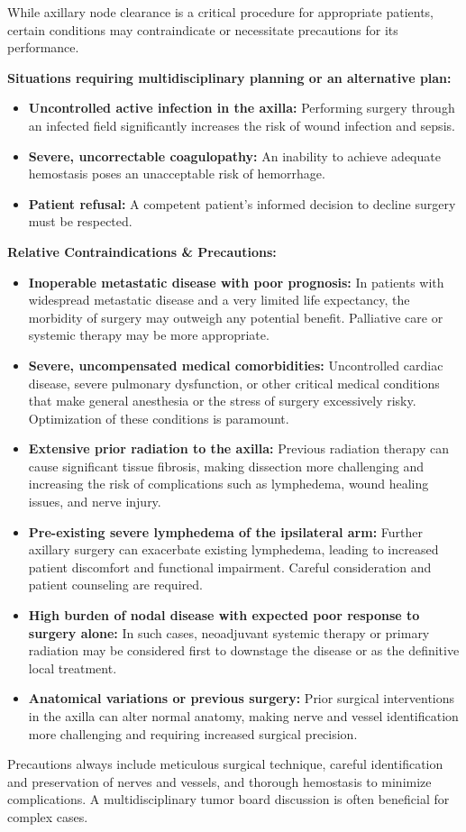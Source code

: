 While axillary node clearance is a critical procedure for appropriate patients, certain conditions may contraindicate or necessitate precautions for its performance.

\textbf{Situations requiring multidisciplinary planning or an alternative plan:}
\begin{itemize}
  \item \textbf{Uncontrolled active infection in the axilla:} Performing surgery through an infected field significantly increases the risk of wound infection and sepsis.
  \item \textbf{Severe, uncorrectable coagulopathy:} An inability to achieve adequate hemostasis poses an unacceptable risk of hemorrhage.
  \item \textbf{Patient refusal:} A competent patient's informed decision to decline surgery must be respected.
\end{itemize}

\textbf{Relative Contraindications \& Precautions:}
\begin{itemize}
  \item \textbf{Inoperable metastatic disease with poor prognosis:} In patients with widespread metastatic disease and a very limited life expectancy, the morbidity of surgery may outweigh any potential benefit. Palliative care or systemic therapy may be more appropriate.
  \item \textbf{Severe, uncompensated medical comorbidities:} Uncontrolled cardiac disease, severe pulmonary dysfunction, or other critical medical conditions that make general anesthesia or the stress of surgery excessively risky. Optimization of these conditions is paramount.
  \item \textbf{Extensive prior radiation to the axilla:} Previous radiation therapy can cause significant tissue fibrosis, making dissection more challenging and increasing the risk of complications such as lymphedema, wound healing issues, and nerve injury.
  \item \textbf{Pre-existing severe lymphedema of the ipsilateral arm:} Further axillary surgery can exacerbate existing lymphedema, leading to increased patient discomfort and functional impairment. Careful consideration and patient counseling are required.
  \item \textbf{High burden of nodal disease with expected poor response to surgery alone:} In such cases, neoadjuvant systemic therapy or primary radiation may be considered first to downstage the disease or as the definitive local treatment.
  \item \textbf{Anatomical variations or previous surgery:} Prior surgical interventions in the axilla can alter normal anatomy, making nerve and vessel identification more challenging and requiring increased surgical precision.
\end{itemize}
Precautions always include meticulous surgical technique, careful identification and preservation of nerves and vessels, and thorough hemostasis to minimize complications. A multidisciplinary tumor board discussion is often beneficial for complex cases.

